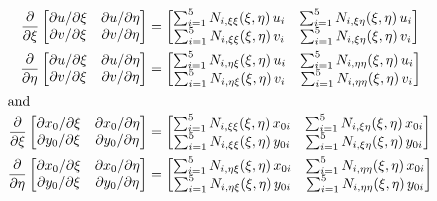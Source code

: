 \begin{subequations}
	\begin{align}
	\frac{\partial}{\partial \xi}
	\begin{bmatrix}
	\partial u / \partial\xi & \partial u / \partial\eta \\
	\partial v / \partial\xi & \partial v / \partial\eta
	\end{bmatrix} & = 
	\begin{bmatrix}
	\sum\nolimits_{i=1}^5 N_{i,\xi\xi} (\xi,\eta) \, u_i & \sum\nolimits_{i=1}^5 N_{i,\xi\eta} (\xi,\eta) \, u_i \\
	\sum\nolimits_{i=1}^5 N_{i,\xi\xi} (\xi,\eta) \, v_i & \sum\nolimits_{i=1}^5 N_{i,\xi\eta} (\xi,\eta) \, v_i
	\end{bmatrix} \\
	\frac{\partial}{\partial \eta}
	\begin{bmatrix}
	\partial u / \partial\xi & \partial u / \partial\eta \\
	\partial v / \partial\xi & \partial v / \partial\eta
	\end{bmatrix} & = 
	\begin{bmatrix}
	\sum\nolimits_{i=1}^5 N_{i,\eta\xi} (\xi,\eta) \, u_i & \sum\nolimits_{i=1}^5 N_{i,\eta\eta} (\xi,\eta) \, u_i \\
	\sum\nolimits_{i=1}^5 N_{i,\eta\xi} (\xi,\eta) \, v_i & \sum\nolimits_{i=1}^5 N_{i,\eta\eta} (\xi,\eta) \, v_i 
	\end{bmatrix} \\
	\intertext{and}
	\frac{\partial}{\partial \xi}
	\begin{bmatrix}
	\partial x_0 / \partial\xi & \partial x_0 / \partial\eta \\
	\partial y_0 / \partial\xi & \partial y_0 / \partial\eta
	\end{bmatrix} & = 
	\begin{bmatrix}
	\sum\nolimits_{i=1}^5 N_{i,\xi\xi} (\xi,\eta) \, x_{0i} & \sum\nolimits_{i=1}^5 N_{i,\xi\eta} (\xi,\eta) \, x_{0i} \\
	\sum\nolimits_{i=1}^5 N_{i,\xi\xi} (\xi,\eta) \, y_{0i} & \sum\nolimits_{i=1}^5 N_{i,\xi\eta} (\xi,\eta) \, y_{0i}
	\end{bmatrix} \\
	\frac{\partial}{\partial \eta}
	\begin{bmatrix}
	\partial x_0 / \partial\xi & \partial x_0 / \partial\eta \\
	\partial y_0 / \partial\xi & \partial y_0 / \partial\eta
	\end{bmatrix} & = 
	\begin{bmatrix}
	\sum\nolimits_{i=1}^5 N_{i,\eta\xi} (\xi,\eta) \, x_{0i} & \sum\nolimits_{i=1}^5 N_{i,\eta\eta} (\xi,\eta) \, x_{0i} \\
	\sum\nolimits_{i=1}^5 N_{i,\eta\xi} (\xi,\eta) \, y_{0i} & \sum\nolimits_{i=1}^5 N_{i,\eta\eta} (\xi,\eta) \, y_{0i}
	\end{bmatrix}
	\end{align}
\end{subequations}

